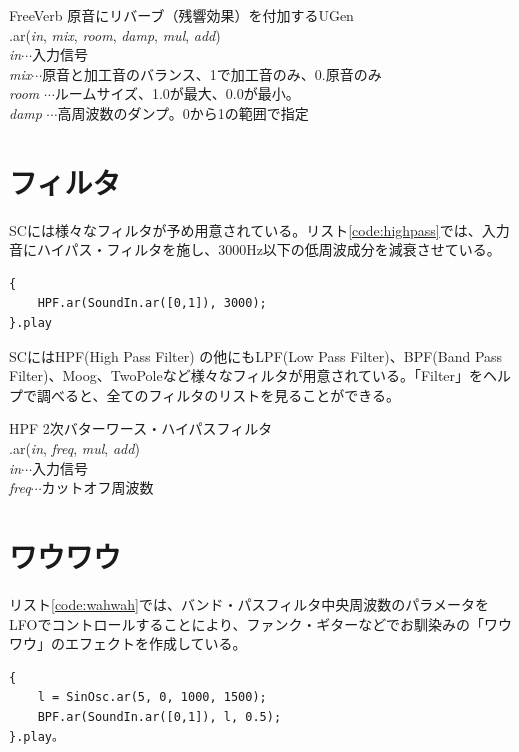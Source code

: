 \documentclass{jsarticle}
\begin{document}
\begin{itembox}[l]{FreeVerb}
{\footnotesize 
原音にリバーブ（残響効果）を付加するUGen\\
.ar({\it in}, {\it mix}, {\it room}, {\it damp}, {\it mul}, {\it add})\\
{\it in}$\cdots$入力信号\\
{\it mix}$\cdots$原音と加工音のバランス、1で加工音のみ、0.原音のみ\\
{\it room} $\cdots$ルームサイズ、1.0が最大、0.0が最小。\\
{\it damp} $\cdots$高周波数のダンプ。0から1の範囲で指定\\
}
\end{itembox}

\section{フィルタ}
SCには様々なフィルタが予め用意されている。リスト\ref{code:highpass}では、入力音にハイパス・フィルタを施し、3000Hz以下の低周波成分を減衰させている。

\begin{lstlisting}[caption=ハイパス・フィルタ, label=code:highpass]
{
	HPF.ar(SoundIn.ar([0,1]), 3000);
}.play
\end{lstlisting}

SCにはHPF(High Pass Filter) の他にもLPF(Low Pass Filter)、BPF(Band Pass Filter)、Moog、TwoPoleなど様々なフィルタが用意されている。「Filter」をヘルプで調べると、全てのフィルタのリストを見ることができる。

\begin{itembox}[l]{HPF}
{\footnotesize 
2次バターワース・ハイパスフィルタ\\
.ar({\it in}, {\it freq}, {\it mul}, {\it add})\\

{\it in}$\cdots$入力信号\\
{\it freq}$\cdots$カットオフ周波数\\
}
\end{itembox}

\section{ワウワウ}
リスト\ref{code:wahwah}では、バンド・パスフィルタ中央周波数のパラメータをLFOでコントロールすることにより、ファンク・ギターなどでお馴染みの「ワウワウ」のエフェクトを作成している。
\begin{lstlisting}[caption=ワウワウ, label=code:wahwah]
{
	l = SinOsc.ar(5, 0, 1000, 1500);
	BPF.ar(SoundIn.ar([0,1]), l, 0.5);
}.play。
\end{lstlisting}
\end{document}
